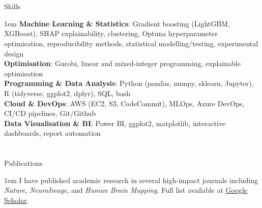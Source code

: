 \documentclass{my_cv}
\begin{document}
\section{\faCogs}{Skills}
{\begin{addmargin}[2em]{1em}
\textbf{Machine Learning \& Statistics}: Gradient boosting (LightGBM, XGBoost), SHAP explainability, clustering, Optuna hyperparameter optimisation, reproducibility methods, statistical modelling/testing, experimental design \\
\textbf{Optimisation}: Gurobi, linear and mixed-integer programming, explainable optimisation \\
\textbf{Programming \& Data Analysis}: Python (pandas, numpy, sklearn, Jupyter), R (tidyverse, ggplot2, dplyr), SQL, bash \\
\textbf{Cloud \& DevOps}: AWS (EC2, S3, CodeCommit), MLOps, Azure DevOps, CI/CD pipelines, Git/Github \\
\textbf{Data Visualisation \& BI}: Power BI, ggplot2, matplotlib, interactive dashboards, report automation
\end{addmargin}}
\section{\faPencil}{Publications}
{\begin{addmargin}[2em]{1em}
I have published academic research in several high-impact journals including \textit{Nature}, \textit{NeuroImage}, and \textit{Human Brain Mapping}. Full list available at \href{https://scholar.google.com/citations?user=h4aoOucAAAAJ}{Google Scholar}.
%
\end{addmargin}}
    
\end{document}
